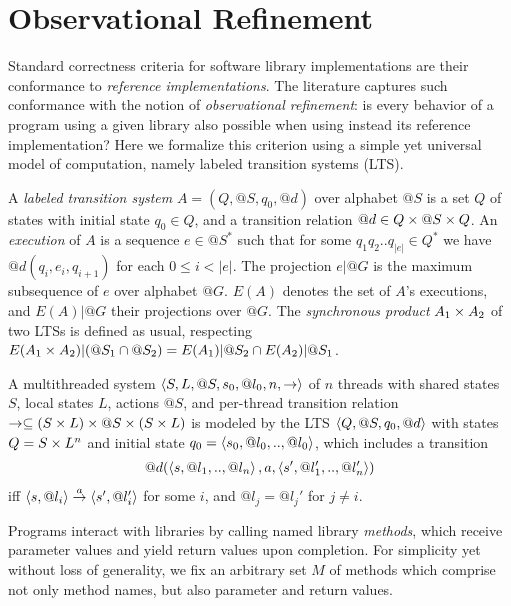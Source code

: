 
\section{Observational Refinement}

Standard correctness criteria for software library implementations are their
conformance to \emph{reference implementations}. The literature captures such
conformance with the notion of \emph{observational refinement}: is every
behavior of a program using a given library also possible when using instead
its reference implementation? Here we formalize this criterion using a simple
yet universal model of computation, namely labeled transition systems (LTS).

A \emph{labeled transition system} $A = (Q,@S,q_0,@d)$ over alphabet $@S$ is a
set $Q$ of states with initial state $q_0 \in Q$, and a transition relation $@d
\in Q \times @S \times Q$. An \emph{execution} of $A$ is a sequence $e \in @S^*$ such
that for some $q_1 q_2 .. q_{|e|} \in Q^*$ we have $@d(q_i,e_i,q_{i+1})$ for
each $0 \le i < |e|$. The projection $e|@G$ is the maximum subsequence of $e$
over alphabet $@G$. $E(A)$ denotes the set of $A$'s executions, and $E(A)|@G$
their projections over $@G$. The \emph{synchronous product} $A_1 \times A_2$ of two
LTSs is defined as usual, respecting $E(A_1 \times A_2)|(@S_1 \cap @S_2) =
E(A_1)|@S_2 \cap E(A_2)|@S_1$.

\begin{example}
  \label{ex:threads}

  A multithreaded system $\left\langle {S,L,@S,s_0,@l_0,n,->} \right\rangle$ of $n$ threads with
  shared states $S$, local states $L$, actions $@S$, and per-thread transition
  relation $-> \subseteq (S \times L) \times @S \times (S \times L)$ is modeled by the LTS
  $\left\langle {Q,@S,q_0,@d} \right\rangle$ with states $Q = S \times L^n$ and initial state $q_0 =
  \left\langle {s_0, @l_0, .., @l_0} \right\rangle$, which includes a transition
  \begin{align*}
    @d(\left\langle {s, @l_1, .., @l_n} \right\rangle, a, \left\langle {s', @l_1', .., @l_n'} \right\rangle)
  \end{align*}
  iff $\left\langle {s,@l_i} \right\rangle \overset{a}{\rightarrow} \left\langle {s',@l_i'} \right\rangle$ for some $i$, and
  $@l_j = @l_j'$ for $j \neq i$.

\end{example}

Programs interact with libraries by calling named library \emph{methods}, which
receive parameter values and yield return values upon completion. For
simplicity yet without loss of generality, we fix an arbitrary set $M$ of
methods which comprise not only method names, but also parameter and return
values.

